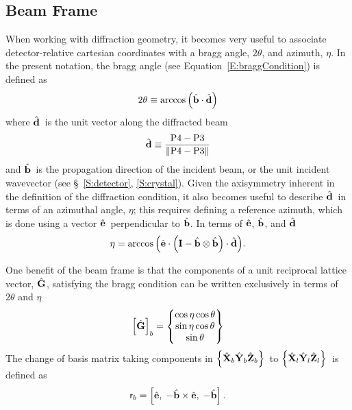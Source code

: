 \documentclass[12pt,letterpaper,final]{amsart}
\newcommand{\mbm}[1]{\ensuremath{\mbox{\boldmath$#1$}}}
\newcommand{\ghat}{\ensuremath{\hat{\mbm{\mathrm{G}}}}}
\newcommand{\bhat}{\ensuremath{\hat{\mbm{\mathrm{b}}}}}
\newcommand{\dhat}{\ensuremath{\hat{\mbm{\mathrm{d}}}}}
\newcommand{\ehat}{\ensuremath{\hat{\mbm{\mathrm{e}}}}}
\newcommand{\eye}{\ensuremath{\mbm{\mathrm{I}}}}
\newcommand{\Pthree}{\ensuremath{\mathrm{P3}}}
\newcommand{\Pfour}{\ensuremath{\mathrm{P4}}}
\newcommand{\Xl}{\ensuremath{\hat{\mbm{\mathrm{X}}}_l}}
\newcommand{\Yl}{\ensuremath{\hat{\mbm{\mathrm{Y}}}_l}}
\newcommand{\Zl}{\ensuremath{\hat{\mbm{\mathrm{Z}}}_l}}
\newcommand{\labframe}{\ensuremath{\left\{\Xl\Yl\Zl\right\}}}
\newcommand{\Xb}{\ensuremath{\hat{\mbm{\mathrm{X}}}_b}}
\newcommand{\Yb}{\ensuremath{\hat{\mbm{\mathrm{Y}}}_b}}
\newcommand{\Zb}{\ensuremath{\hat{\mbm{\mathrm{Z}}}_b}}
\newcommand{\beamframe}{\ensuremath{\left\{\Xb\Yb\Zb\right\}}}
\newcommand{\beamcomps}[1]{\left[#1\right]_b}
\newcommand{\eqnref}[1]{Equation~\ref{#1}}
\newcommand{\secref}[1]{\S~\ref{#1}}
\begin{document}
\subsection{Beam Frame}
When working with diffraction geometry, it becomes very useful to associate detector-relative cartesian coordinates with a bragg angle, $2\theta$, and azimuth, $\eta$.  In the present notation, the bragg angle (see \eqnref{E:braggCondition}) is defined as
\begin{equation}
  2\theta \equiv \arccos{\left( \bhat \cdot \dhat \right)}
\end{equation}
where \dhat\ is the unit vector along the diffracted beam 
\begin{equation}
  \dhat \equiv \frac{\Pfour-\Pthree}{\|\Pfour-\Pthree\|}
\end{equation}
and \bhat\ is the propagation direction of the incident beam, or the unit incident wavevector (see \secref{S:detector}, \ref{S:crystal}).  Given the axisymmetry inherent in the definition of the diffraction condition, it also becomes useful to describe \dhat\ in terms of an azimuthal angle, $\eta$; this requires defining a reference azimuth, which is done using a vector \ehat\ perpendicular to \bhat.  In terms of \ehat, \bhat, and \dhat\
\begin{equation}
  \eta = \arccos{\left(\ehat \cdot \left( \eye - \bhat \otimes \bhat \right)\cdot\dhat\right)}.
\end{equation}

One benefit of the beam frame is that the components of a unit reciprocal lattice vector, \ghat, satisfying the bragg condition can be written exclusively in terms of $2\theta$ and $\eta$
\begin{equation}
  \beamcomps{\ghat}=\begin{Bmatrix}
    \cos\eta \cos\theta \\
    \sin\eta \cos\theta \\
    \sin\theta
  \end{Bmatrix}
\end{equation}
The change of basis matrix taking components in \beamframe\ to \labframe\ is defined as
\begin{equation}
  \mathsf{r}_b = \left[ \ehat,\; -\bhat\times\ehat,\; -\bhat \right].
  \label{E:etaFrame}
\end{equation}
\end{document}
